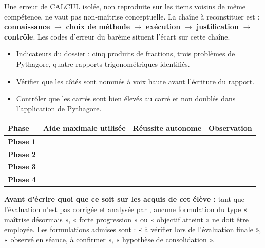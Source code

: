 \documentclass[10pt,a4paper]{article}
\begin{document}
Une erreur de \textsc{CALCUL} isolée, non reproduite sur les items voisins de même compétence, ne vaut pas non-maîtrise conceptuelle. La chaîne à reconstituer est : \textbf{connaissance} $\rightarrow$ \textbf{choix de méthode} $\rightarrow$ \textbf{exécution} $\rightarrow$ \textbf{justification} $\rightarrow$ \textbf{contrôle}. Les codes d'erreur du barème situent l'écart sur cette chaîne.
\begin{itemize}\item Indicateurs du dossier : cinq produits de fractions, trois problèmes de Pythagore, quatre rapports trigonométriques identifiés.\item Vérifier que les côtés sont nommés à voix haute avant l'écriture du rapport.\item Contrôler que les carrés sont bien élevés au carré et non doublés dans l'application de Pythagore.\end{itemize}
\par\noindent\begin{tabularx}{\linewidth}{>{\bfseries}p{26mm} X X X}
\toprule Phase & Aide maximale utilisée & Réussite autonome & Observation \\ \midrule
Phase 1 & & & \\[6mm]
Phase 2 & & & \\[6mm]
Phase 3 & & & \\[6mm]
Phase 4 & & & \\[6mm]
\bottomrule\end{tabularx}
\begin{warningbox}\textbf{Avant d'écrire quoi que ce soit sur les acquis de cet élève :} tant que l'évaluation n'est pas corrigée et analysée par , aucune formulation du type « maîtrise désormais », « forte progression » ou « objectif atteint » ne doit être employée. Les formulations admises sont : « à vérifier lors de l'évaluation finale », « observé en séance, à confirmer », « hypothèse de consolidation ».\end{warningbox}
\end{document}
